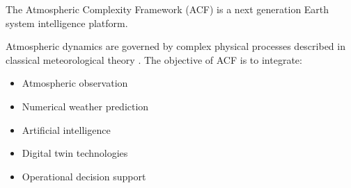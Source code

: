 The Atmospheric Complexity Framework (ACF) is a next generation
Earth system intelligence platform.

Atmospheric dynamics are governed by complex physical processes
described in classical meteorological theory
\cite{holton2004,wallace2006}.
The objective of ACF is to integrate:

\begin{itemize}
\item Atmospheric observation
\item Numerical weather prediction
\item Artificial intelligence
\item Digital twin technologies
\item Operational decision support
\end{itemize}

